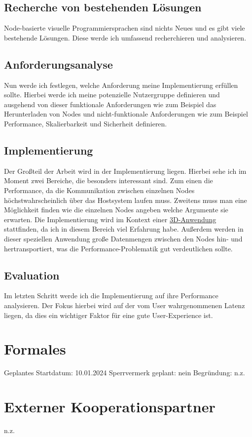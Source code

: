 \documentclass[ngerman]{article}
\begin{document}
\subsection{Recherche von bestehenden Lösungen}
Node-basierte visuelle Programmiersprachen sind nichts Neues und es gibt viele bestehende Lösungen. Diese werde ich umfassend recherchieren und analysieren. 

\subsection{Anforderungsanalyse}
Nun werde ich festlegen, welche Anforderung meine Implementierung erfüllen sollte. Hierbei werde ich meine potenzielle Nutzergruppe definieren und ausgehend von dieser funktionale Anforderungen wie zum Beispiel das Herunterladen von Nodes und nicht-funktionale Anforderungen wie zum Beispiel Performance, Skalierbarkeit und Sicherheit definieren.

\subsection{Implementierung}
Der Großteil der Arbeit wird in der Implementierung liegen. Hierbei sehe ich im Moment zwei Bereiche, die besonders interessant sind. Zum einen die Performance, da die Kommunikation zwischen einzelnen Nodes höchstwahrscheinlich über das Hostsystem laufen muss. Zweitens muss man eine Möglichkeit finden wie die einzelnen Nodes angeben welche Argumente sie erwarten. 
\linebreak
\linebreak
Die Implementierung wird im Kontext einer \href{https://plant.max-richter.dev}{3D-Anwendung} stattfinden, da ich in diesem Bereich viel Erfahrung habe. Außerdem werden in dieser speziellen Anwendung große Datenmengen zwischen den Nodes hin- und hertransportiert, was die Performance-Problematik gut verdeutlichen sollte.

\subsection{Evaluation}
Im letzten Schritt werde ich die Implementierung auf ihre Performance analysieren. Der Fokus hierbei wird auf der vom User wahrgenommenen Latenz liegen, da dies ein wichtiger Faktor für eine gute User-Experience ist. \cite{6876022}

\section{Formales}
Geplantes Startdatum: 10.01.2024
\linebreak
Sperrvermerk geplant: nein
\linebreak
Begründung: n.z.

\section{Externer Kooperationspartner}
n.z.

\pagebreak

\printbibliography
\end{document}
